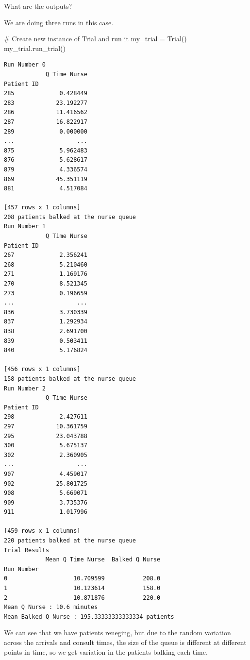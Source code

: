 \documentclass[
  letterpaper,
  DIV=11,
  numbers=noendperiod]{scrreprt}
\newenvironment{Shaded}{\begin{snugshade}}{\end{snugshade}}
\newcommand{\CommentTok}[1]{\textcolor[rgb]{0.37,0.37,0.37}{#1}}
\newcommand{\NormalTok}[1]{\textcolor[rgb]{0.00,0.23,0.31}{#1}}
\newcommand{\OperatorTok}[1]{\textcolor[rgb]{0.37,0.37,0.37}{#1}}
\begin{document}
What are the outputs?

We are doing three runs in this case.

\begin{Shaded}
\begin{Highlighting}[]
\CommentTok{\# Create new instance of Trial and run it}
\NormalTok{my\_trial }\OperatorTok{=}\NormalTok{ Trial()}
\NormalTok{my\_trial.run\_trial()}
\end{Highlighting}
\end{Shaded}

\begin{verbatim}
Run Number 0
            Q Time Nurse
Patient ID              
285             0.428449
283            23.192277
286            11.416562
287            16.822917
289             0.000000
...                  ...
875             5.962483
876             5.628617
879             4.336574
869            45.351119
881             4.517084

[457 rows x 1 columns]
208 patients balked at the nurse queue
Run Number 1
            Q Time Nurse
Patient ID              
267             2.356241
268             5.210460
271             1.169176
270             8.521345
273             0.196659
...                  ...
836             3.730339
837             1.292934
838             2.691700
839             0.503411
840             5.176824

[456 rows x 1 columns]
158 patients balked at the nurse queue
Run Number 2
            Q Time Nurse
Patient ID              
298             2.427611
297            10.361759
295            23.043788
300             5.675137
302             2.360905
...                  ...
907             4.459017
902            25.801725
908             5.669071
909             3.735376
911             1.017996

[459 rows x 1 columns]
220 patients balked at the nurse queue
Trial Results
            Mean Q Time Nurse  Balked Q Nurse
Run Number                                   
0                   10.709599           208.0
1                   10.123614           158.0
2                   10.871876           220.0
Mean Q Nurse : 10.6 minutes
Mean Balked Q Nurse : 195.33333333333334 patients
\end{verbatim}

We can see that we have patients reneging, but due to the random
variation across the arrivals and consult times, the size of the queue
is different at different points in time, so we get variation in the
patients balking each time.
\end{document}
